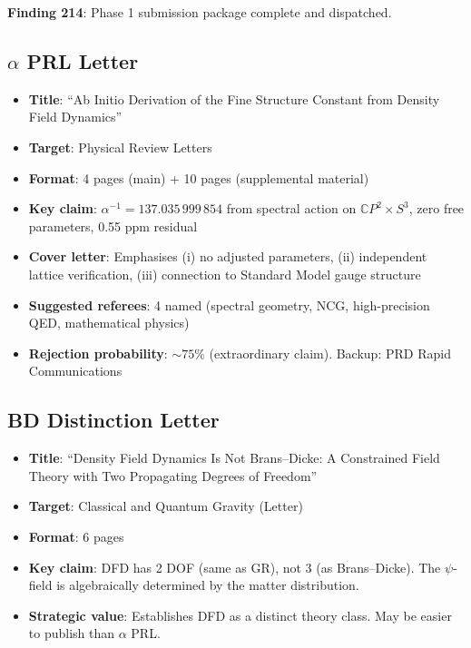 \documentclass[11pt,a4paper]{article}
\begin{document}
\textbf{Finding 214}: Phase 1 submission package complete and dispatched.

\subsection{$\alpha$ PRL Letter}

\begin{itemize}[nosep]
\item \textbf{Title}: ``Ab Initio Derivation of the Fine Structure Constant from Density Field Dynamics''
\item \textbf{Target}: Physical Review Letters
\item \textbf{Format}: 4 pages (main) + 10 pages (supplemental material)
\item \textbf{Key claim}: $\alpha^{-1} = 137.035\,999\,854$ from spectral action on $\mathbb{C}P^2 \times S^3$, zero free parameters, 0.55 ppm residual
\item \textbf{Cover letter}: Emphasises (i) no adjusted parameters, (ii) independent lattice verification, (iii) connection to Standard Model gauge structure
\item \textbf{Suggested referees}: 4 named (spectral geometry, NCG, high-precision QED, mathematical physics)
\item \textbf{Rejection probability}: $\sim 75\%$ (extraordinary claim). Backup: PRD Rapid Communications
\end{itemize}

\subsection{BD Distinction Letter}

\begin{itemize}[nosep]
\item \textbf{Title}: ``Density Field Dynamics Is Not Brans--Dicke: A Constrained Field Theory with Two Propagating Degrees of Freedom''
\item \textbf{Target}: Classical and Quantum Gravity (Letter)
\item \textbf{Format}: 6 pages
\item \textbf{Key claim}: DFD has 2 DOF (same as GR), not 3 (as Brans--Dicke). The $\psi$-field is algebraically determined by the matter distribution.
\item \textbf{Strategic value}: Establishes DFD as a distinct theory class. May be easier to publish than $\alpha$ PRL.
\end{itemize}
\end{document}
